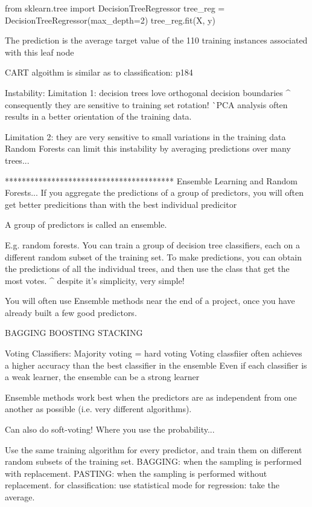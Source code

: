 from sklearn.tree import DecisionTreeRegressor
tree_reg = DecisionTreeRegressor(max_depth=2)
tree_reg.fit(X, y)

The prediction is the average target value of the
110 training instances associated with this leaf node

CART algoithm is similar as to classification: p184

Instability:
Limitation 1: decision trees love orthogonal decision boundaries
^ consequently they are sensitive to training set rotation!
^^ PCA analysis often results in a better orientation of the training data.

Limitation 2: they are very sensitive to small variations in the training data
Random Forests can limit this instability by averaging predictions over many trees...

****************************************
Ensemble Learning and Random Forests...
If you aggregate the predictions of a group of predictors,
you will often get better predicitions than with the best individual predicitor

A group of predictors is called an ensemble.

E.g. random forests.
You can train a group of decision tree classifiers,
each on a different random subset of the training set.
To make predictions, you can obtain the predictions of all the individual trees,
and then use the class that get the most votes.
^ despite it's simplicity, very simple!

You will often use Ensemble methods near the end of a project,
once you have already built a few good predictors.

BAGGING
BOOSTING
STACKING

Voting Classifiers:
Majority voting = hard voting
Voting classfiier often achieves a higher accuracy than the best classifier in the ensemble
Even if each classifier is a weak learner,
the ensemble can be a strong learner

Ensemble methods work best when the predictors are
as independent from one another as possible (i.e. very different algorithms).

Can also do soft-voting! Where you use the probability...


Use the same training algorithm for every predictor,
and train them on different random subsets of the training set.
BAGGING: when the sampling is performed with replacement.
PASTING: when the sampling is performed without replacement.
for classification: use statistical mode
for regression: take the average.

